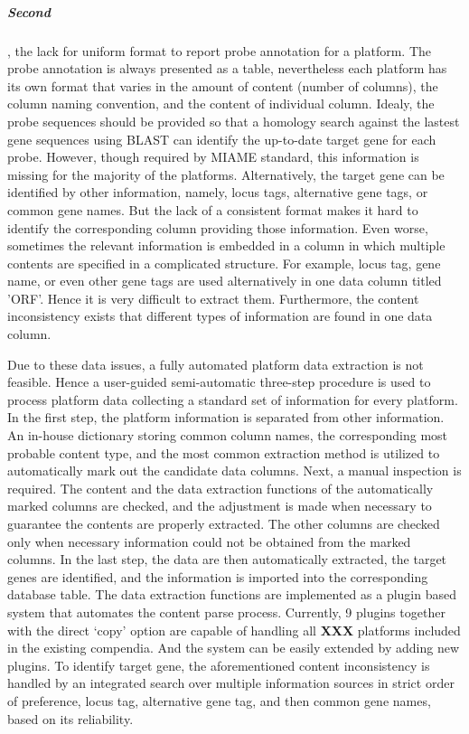 \subparagraph{Second}, the lack for uniform format to report probe annotation for a
platform.
%
The probe annotation is always presented as a table, nevertheless each
platform has its own format that varies in the amount of content (number
of columns), the column naming convention, and the content of individual
column.
%
Idealy, the probe sequences should be provided so that a homology search
against the lastest gene sequences using BLAST \cite{BLAST} can identify
the up-to-date target gene for each probe.
%
However, though required by MIAME\cite{MIAME} standard, this
information is missing for the majority of the platforms.
%
Alternatively, the target gene can be identified by other information,
namely, locus tags, alternative gene tags, or common gene names.
%
But the lack of a consistent format makes it hard to identify the
corresponding column providing those information.
%
Even worse, sometimes the relevant information is embedded in a column in
which multiple contents are specified in a complicated structure. 
%
For example, locus tag, gene name, or even other gene tags are used
alternatively in one data column titled 'ORF'.
%
Hence it is very difficult to extract them.
%
Furthermore, the content inconsistency exists that different types of
information are found in one data column.

Due to these data issues, a fully automated platform data extraction is
not feasible.
%
Hence a user-guided semi-automatic three-step procedure is used to process
platform data collecting a standard set of information for every platform.
%
In the first step, the platform information is separated from other
information.
%
An in-house dictionary storing common column names, the corresponding most
probable content type, and the most common extraction method is utilized
to automatically mark out the candidate data columns.
%
Next, a manual inspection is required. 
%
The content and the data extraction functions of the automatically marked
columns are checked, and the adjustment is made when necessary to
guarantee the contents are properly extracted.
%
The other columns are checked only when necessary information could not be
obtained from the marked columns.
%
In the last step, the data are then automatically extracted, the target
genes are identified, and the information is imported into the
corresponding database table.
%
The data extraction functions are implemented as a plugin based system
that automates the content parse process.  Currently, 9 plugins together
with the direct `copy' option are capable of handling all \textbf{XXX}
platforms included in the existing compendia.  And the system can be
easily extended by adding new plugins.
%
To identify target gene, the aforementioned content inconsistency is
handled by an integrated search over multiple information sources in
strict order of preference, locus tag, alternative gene tag, and then
common gene names, based on its reliability.


